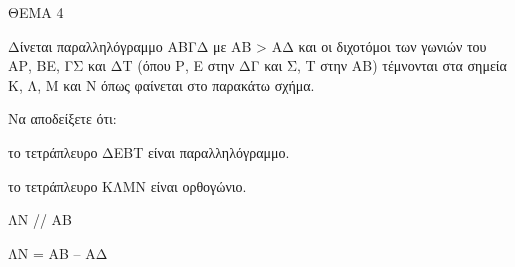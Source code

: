 
ΘΕΜΑ 4

Δίνεται παραλληλόγραμμο ΑΒΓΔ με ΑΒ \textgreater{} ΑΔ και οι διχοτόμοι των γωνιών του ΑΡ, ΒΕ, ΓΣ και ΔΤ (όπου Ρ, Ε στην ΔΓ και Σ, Τ στην ΑΒ) τέμνονται στα σημεία Κ, Λ, M και N όπως φαίνεται στο παρακάτω σχήμα.

Να αποδείξετε ότι:

\begin{alist}
\item το τετράπλευρο ΔΕΒΤ είναι παραλληλόγραμμο. 

\item το τετράπλευρο ΚΛΜΝ είναι ορθογώνιο. 

\item ΛΝ // ΑΒ 

\item ΛΝ = ΑΒ -- ΑΔ 


\end{alist}
